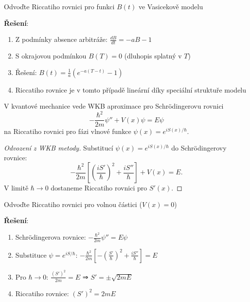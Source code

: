 \begin{example}
\label{ex:vasicek-riccati}
Odvoďte Riccatiho rovnici pro funkci $B(t)$ ve Vasicekově modelu

\textbf{Řešení}:
\begin{enumerate}
\item Z podmínky absence arbitráže: $\frac{dB}{dt} = -a B - 1$
\item S okrajovou podmínkou $B(T) = 0$ (dluhopis splatný v $T$)
\item Řešení: $B(t) = \frac{1}{a}(e^{-a(T-t)} - 1)$
\item Riccatiho rovnice je v tomto případě lineární díky speciální struktuře modelu
\end{enumerate}
\end{example}

\vspace{0.8\baselineskip}

\begin{application}
\label{app:quantum-mechanics}
V kvantové mechanice vede WKB aproximace pro Schrödingerovu rovnici
\[
-\frac{\hbar^2}{2m} \psi'' + V(x)\psi = E\psi
\]
na Riccatiho rovnici pro fázi vlnové funkce $\psi(x) = e^{iS(x)/\hbar}$.
\end{application}

\vspace{0.6\baselineskip}

\begin{proof}[Odvození z WKB metody]
Substitucí $\psi(x) = e^{iS(x)/\hbar}$ do Schrödingerovy rovnice:
\[
-\frac{\hbar^2}{2m} \left[\left(\frac{iS'}{\hbar}\right)^2 + \frac{iS''}{\hbar}\right] + V(x) = E.
\]
V limitě $\hbar \to 0$ dostaneme Riccatiho rovnici pro $S'(x)$.
\end{proof}

\vspace{0.6\baselineskip}

\begin{example}
\label{ex:quantum-riccati}
Odvoďte Riccatiho rovnici pro volnou částici ($V(x) = 0$)

\textbf{Řešení}:
\begin{enumerate}
\item Schrödingerova rovnice: $-\frac{\hbar^2}{2m} \psi'' = E\psi$
\item Substituce $\psi = e^{iS/\hbar}$: $-\frac{\hbar^2}{2m} \left[-\left(\frac{S'}{\hbar}\right)^2 + \frac{iS''}{\hbar}\right] = E$
\item Pro $\hbar \to 0$: $\frac{(S')^2}{2m} = E$ ⇒ $S' = \pm \sqrt{2mE}$
\item Riccatiho rovnice: $(S')^2 = 2mE$
\end{enumerate}
\end{example}

